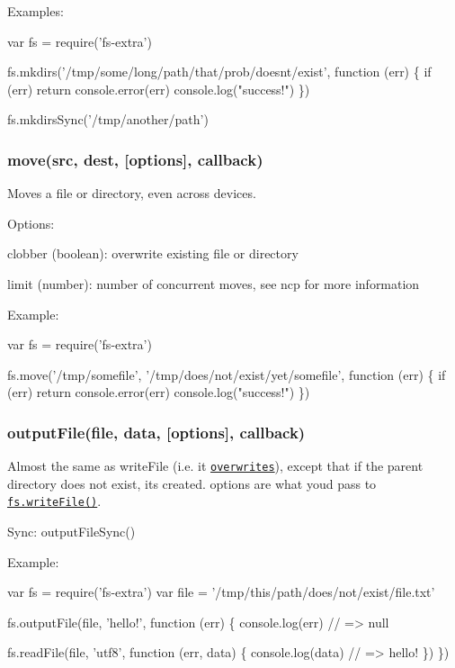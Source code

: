 Examples\+:


\begin{DoxyCode}
var fs = require('fs-extra')

fs.mkdirs('/tmp/some/long/path/that/prob/doesnt/exist', function (err) \{
  if (err) return console.error(err)
  console.log("success!")
\})

fs.mkdirsSync('/tmp/another/path')
\end{DoxyCode}


\subsubsection*{move(src, dest, \mbox{[}options\mbox{]}, callback)}

Moves a file or directory, even across devices.

Options\+:
\begin{DoxyItemize}
\item clobber (boolean)\+: overwrite existing file or directory
\item limit (number)\+: number of concurrent moves, see ncp for more information
\end{DoxyItemize}

Example\+:


\begin{DoxyCode}
var fs = require('fs-extra')

fs.move('/tmp/somefile', '/tmp/does/not/exist/yet/somefile', function (err) \{
  if (err) return console.error(err)
  console.log("success!")
\})
\end{DoxyCode}


\subsubsection*{output\+File(file, data, \mbox{[}options\mbox{]}, callback)}

Almost the same as {\ttfamily write\+File} (i.\+e. it \href{http://pages.citebite.com/v2o5n8l2f5reb}{\tt overwrites}), except that if the parent directory does not exist, it\textquotesingle{}s created. {\ttfamily options} are what you\textquotesingle{}d pass to \href{https://nodejs.org/api/fs.html#fs_fs_writefile_file_data_options_callback}{\tt {\ttfamily fs.\+write\+File()}}.

Sync\+: {\ttfamily output\+File\+Sync()}

Example\+:


\begin{DoxyCode}
var fs = require('fs-extra')
var file = '/tmp/this/path/does/not/exist/file.txt'

fs.outputFile(file, 'hello!', function (err) \{
  console.log(err) // => null

  fs.readFile(file, 'utf8', function (err, data) \{
    console.log(data) // => hello!
  \})
\})
\end{DoxyCode}


